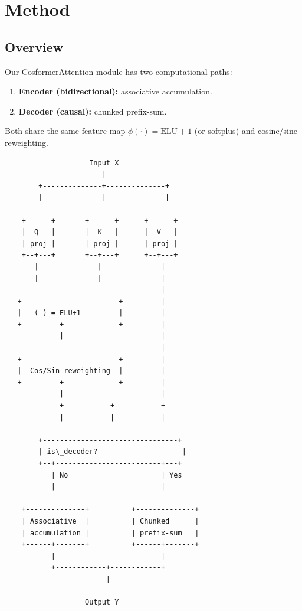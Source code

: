 
\section{Method}

\subsection{Overview}

Our CosformerAttention module has two computational paths:

\begin{enumerate}
\item \textbf{Encoder (bidirectional):} associative accumulation.
\item \textbf{Decoder (causal):} chunked prefix-sum.

\end{enumerate}
Both share the same feature map $\phi(\cdot) = \text{ELU} + 1$ (or softplus) 
and cosine/sine reweighting.

\begin{lstlisting}
                    Input X
                       |
        +--------------+--------------+
        |              |              |
                                       
    +------+       +------+      +------+
    |  Q   |       |  K   |      |  V   |
    | proj |       | proj |      | proj |
    +--+---+       +--+---+      +--+---+
       |              |              |
       |              |              |
                                     |
   +-----------------------+         |
   |   ( ) = ELU+1         |         |
   +---------+-------------+         |
             |                       |
                                     |
   +-----------------------+         |
   |  Cos/Sin reweighting  |         |
   +---------+-------------+         |
             |                       |
             +-----------+-----------+
             |           |           |
                                      
        +--------------------------------+
        | is\_decoder?                    |
        +--+-------------------------+---+
           | No                      | Yes
           |                         |
                                      
    +--------------+          +--------------+
    | Associative  |          | Chunked      |
    | accumulation |          | prefix-sum   |
    +------+-------+          +------+-------+
           |                         |
           +------------+------------+
                        |
                         
                   Output Y
\end{lstlisting}

